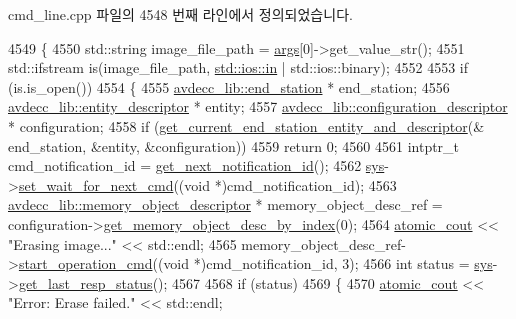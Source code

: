 cmd\+\_\+line.\+cpp 파일의 4548 번째 라인에서 정의되었습니다.


\begin{DoxyCode}
4549 \{
4550     std::string image\_file\_path = \hyperlink{namespaceastime__fitline_a8187411843a6284ffb964ef3fb9fcab3}{args}[0]->get\_value\_str();
4551     std::ifstream is(image\_file\_path, \hyperlink{jack_8c_afc03a33132f7c0bcacbeeeaf5b8510c0}{std::ios::in} | std::ios::binary);
4552 
4553     \textcolor{keywordflow}{if} (is.is\_open())
4554     \{
4555         \hyperlink{classavdecc__lib_1_1end__station}{avdecc\_lib::end\_station} * end\_station;
4556         \hyperlink{classavdecc__lib_1_1entity__descriptor}{avdecc\_lib::entity\_descriptor} * entity;
4557         \hyperlink{classavdecc__lib_1_1configuration__descriptor}{avdecc\_lib::configuration\_descriptor} * configuration;
4558         \textcolor{keywordflow}{if} (\hyperlink{classcmd__line_ac2d4611fba7db03d436a2e3c1e64828e}{get\_current\_end\_station\_entity\_and\_descriptor}(&
      end\_station, &entity, &configuration))
4559             \textcolor{keywordflow}{return} 0;
4560 
4561         intptr\_t cmd\_notification\_id = \hyperlink{classcmd__line_a57486218387d1aa9d262eb7c176154ad}{get\_next\_notification\_id}();
4562         \hyperlink{classcmd__line_a485db4800e331cb4052c447fdf5d154e}{sys}->\hyperlink{classavdecc__lib_1_1system_a26b769584f10225077da47583edda33e}{set\_wait\_for\_next\_cmd}((\textcolor{keywordtype}{void} *)cmd\_notification\_id);
4563         \hyperlink{classavdecc__lib_1_1memory__object__descriptor}{avdecc\_lib::memory\_object\_descriptor} * memory\_object\_desc\_ref =
       configuration->\hyperlink{classavdecc__lib_1_1configuration__descriptor_aec4a4aacf26169bc5dd38bc719f4ae82}{get\_memory\_object\_desc\_by\_index}(0);
4564         \hyperlink{cmd__line_8h_a0bc38ccc65c79ba06c6fcd7b4bf554c3}{atomic\_cout} << \textcolor{stringliteral}{"Erasing image..."} << std::endl;
4565         memory\_object\_desc\_ref->\hyperlink{classavdecc__lib_1_1memory__object__descriptor_a0abecb47f59507cddf854b3b62602f22}{start\_operation\_cmd}((\textcolor{keywordtype}{void} *)cmd\_notification\_id, 3);
4566         \textcolor{keywordtype}{int} status = \hyperlink{classcmd__line_a485db4800e331cb4052c447fdf5d154e}{sys}->\hyperlink{classavdecc__lib_1_1system_aa63e8d1a4e51f695cdcccc9340922407}{get\_last\_resp\_status}();
4567 
4568         \textcolor{keywordflow}{if} (status)
4569         \{
4570             \hyperlink{cmd__line_8h_a0bc38ccc65c79ba06c6fcd7b4bf554c3}{atomic\_cout} << \textcolor{stringliteral}{"Error: Erase failed."} << std::endl;

\end{DoxyCode}
